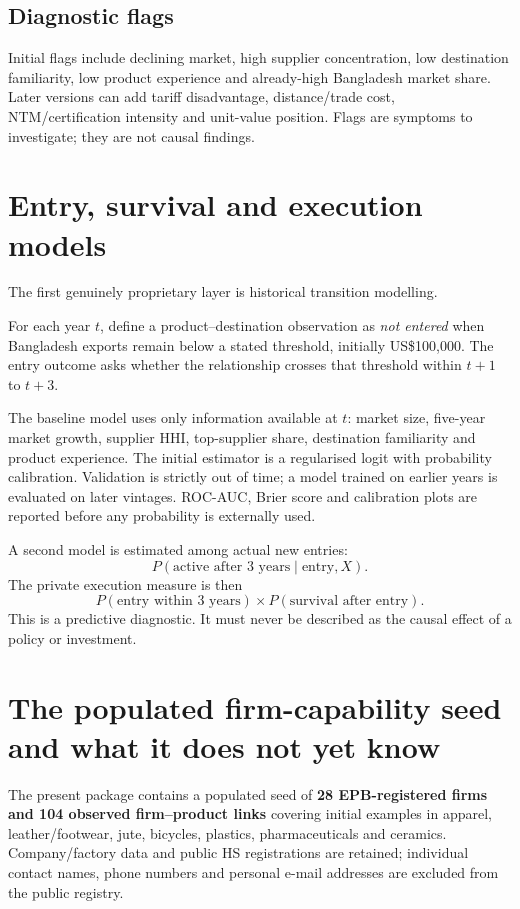 \documentclass[11pt]{article}
\begin{document}
\subsection{Diagnostic flags}
Initial flags include declining market, high supplier concentration, low destination familiarity, low product experience and already-high Bangladesh market share. Later versions can add tariff disadvantage, distance/trade cost, NTM/certification intensity and unit-value position. Flags are symptoms to investigate; they are not causal findings.

\section{Entry, survival and execution models}
The first genuinely proprietary layer is historical transition modelling.

For each year $t$, define a product--destination observation as \emph{not entered} when Bangladesh exports remain below a stated threshold, initially US\$100,000. The entry outcome asks whether the relationship crosses that threshold within $t+1$ to $t+3$.

The baseline model uses only information available at $t$: market size, five-year market growth, supplier HHI, top-supplier share, destination familiarity and product experience. The initial estimator is a regularised logit with probability calibration. Validation is strictly out of time; a model trained on earlier years is evaluated on later vintages. ROC-AUC, Brier score and calibration plots are reported before any probability is externally used.

A second model is estimated among actual new entries:
\[
P(\text{active after 3 years}\mid\text{entry},X).
\]
The private execution measure is then
\[
P(\text{entry within 3 years})\times P(\text{survival after entry}).
\]
This is a predictive diagnostic. It must never be described as the causal effect of a policy or investment.

\section{The populated firm-capability seed and what it does not yet know}
The present package contains a populated seed of \textbf{28 EPB-registered firms and 104 observed firm--product links} covering initial examples in apparel, leather/footwear, jute, bicycles, plastics, pharmaceuticals and ceramics. Company/factory data and public HS registrations are retained; individual contact names, phone numbers and personal e-mail addresses are excluded from the public registry.\par
\end{document}
